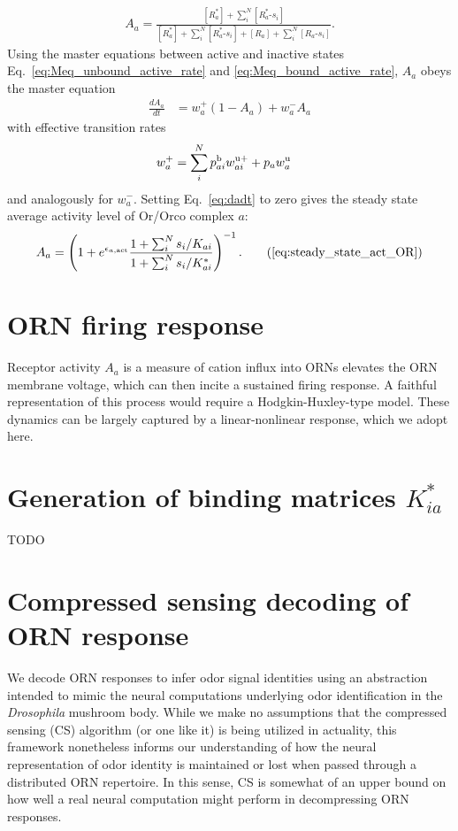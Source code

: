 \documentclass[letterpaper,12pt]{article}
\begin{document}
	\begin{align}
	A_a = \frac{[R^*_a] + \sum_i^N[R^*_a\text{-}s_i]}{[R^*_a] + \sum_i^N[R^*_a\text{-}s_i] + {[R_a] + \sum_i^N[R_a\text{-}s_i]}}.
	\end{align} 
	Using the master equations between active and inactive states Eq.~\ref{eq:Meq_unbound_active_rate} and \ref{eq:Meq_bound_active_rate}, $A_a$  obeys the master equation
	\begin{align}
	\frac{dA_a}{dt} &= w^+_a(1 - A_a) + w^-_aA_a
	\label{eq:dadt}
	\end{align}
	with effective transition rates
	\begin{align}
	w^+_a &= \sum_i^Np^{\text b}_{ai} w^{\text u +}_{ai} + p_{a}w^{\text u}_a 
	\end{align}
	and analogously for $w_a^-$. Setting Eq.~\ref{eq:dadt} to zero gives the steady state average activity level of Or/Orco complex $a$:
	\begin{align}
	A_a = \left(1 + e^{\epsilon_{a, \textup{act}}}\frac{1 + \sum_i^N s_i/K_{ai}}{1 + \sum_i^N s_i/K^*_{ai}}\right)^{-1}. \tag{\ref{eq:steady_state_act_OR}}
	\end{align}
	
	\section*{ORN firing response}
	
	Receptor activity $A_a$ is a measure of cation influx into ORNs elevates the ORN membrane voltage, which can then incite a sustained firing response. A faithful representation of this process would require a Hodgkin-Huxley-type model. These dynamics can be largely captured by a linear-nonlinear response, which we adopt here. 
	
	\section*{Generation of binding matrices $K^*_{ia}$}
	TODO
	
	\section*{Compressed sensing decoding of ORN response}
	We decode ORN responses to infer odor signal identities using an abstraction intended to mimic the neural computations underlying odor identification in the \textit{Drosophila} mushroom body. While we make no assumptions that the compressed sensing (CS) algorithm (or one like it) is being utilized in actuality, this framework nonetheless informs our understanding of how the neural representation of odor identity is maintained or lost when passed through a distributed ORN repertoire. In this sense, CS is somewhat of an upper bound on how well a real neural computation might perform in decompressing ORN responses.
	
\end{document}
